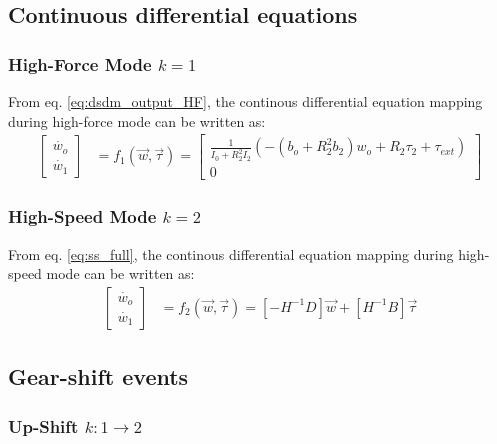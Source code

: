 
\subsection{Continuous differential equations}

\subsubsection{High-Force Mode $k=1$}

From eq. \eqref{eq:dsdm_output_HF}, the continous differential equation mapping during high-force mode can be written as:
%
\begin{align}
\left[
\begin{array}{c}
\dot{w_o}\\
\dot{w_1}
\end{array}
\right] &= f_1( \vec{w} , \vec{\tau} ) = 
\left[ \begin{array}{c}
\frac{1}{I_0 + R^2_2 I_2}\left( -(b_o + R_2^2 b_2) w_o + R_2 \tau_2 + \tau_{ext} \right)\\
0
\end{array} \right]
\label{eq:f1}
\end{align}


\subsubsection{High-Speed Mode $k=2$}

From eq. \eqref{eq:ss_full}, the continous differential equation mapping during high-speed mode can be written as:
%
\begin{align}
\left[
\begin{array}{c}
\dot{w_o}\\
\dot{w_1}
\end{array}
\right] &= f_2( \vec{w} , \vec{\tau} ) = 
\left[ -H^{-1} D \right]
\vec{w} 
+ 
\left[ H^{-1} B \right] 
\vec{\tau}
\label{eq:f2}
\end{align}


\subsection{Gear-shift events}

\subsubsection{Up-Shift $k:1\rightarrow2$}

